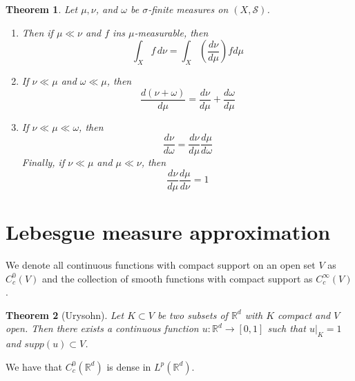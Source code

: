 \documentclass{article}
\newtheorem{theorem}{Theorem}
\theoremstyle{definition}
\numberwithin{theorem}{section}
\numberwithin{equation}{section}
\begin{document}
\begin{theorem}
	Let $\mu, \nu$, and $\omega$ be $\sigma$-finite measures on $(X, \mathcal{S})$.
	\begin{enumerate}
		\item Then if $\mu \ll \nu$ and $f$ ins $\mu$-measurable, then
		\begin{equation}
			\int_X f \, d\nu = \int_X (\dfrac{d\nu}{d\mu}) f d\mu
		\end{equation}
		\item If $\nu \ll \mu$ and $\omega \ll \mu$, then
		\begin{equation}
			\dfrac{d(\nu + \omega)}{d\mu} = \dfrac{d\nu}{d\mu} + \dfrac{d\omega}{d\mu}
		\end{equation}
		\item If $\nu \ll \mu \ll \omega$, then
		\begin{equation}
			\dfrac{d\nu}{d\omega} = \dfrac{d\nu}{d\mu} \dfrac{d\mu}{d\omega}
		\end{equation}
		Finally, if $\nu \ll \mu$ and $\mu \ll \nu$, then
		\begin{equation}
			\dfrac{d\nu}{d\mu} \dfrac{d\mu}{d\nu} = 1
		\end{equation}
	\end{enumerate}
\end{theorem}

\section{Lebesgue measure approximation}
We denote all continuous functions with compact support on an open set $V$ as $C^0_c(V)$ and the collection of smooth functions with compact support as $C^\infty_c(V)$. 
\begin{theorem}[Urysohn]
	Let $K \subset V$ be two subsets of $\mathbb{R}^d$ with $K$ compact and $V$ open. Then there exists a continuous function $u: \mathbb{R}^d  \rightarrow [0, 1]$ such that $u|_K = 1$ and $supp(u) \subset V$. 
\end{theorem}

We have that $C^0_c(\mathbb{R}^d)$ is dense in $L^p(\mathbb{R}^d)$. 
\end{document}

